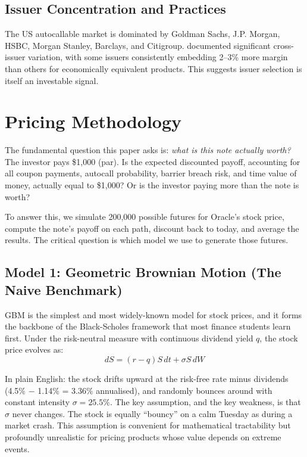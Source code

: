 \documentclass[12pt,a4paper]{article}
\begin{document}
\subsection{Issuer Concentration and Practices}

The US autocallable market is dominated by Goldman Sachs, J.P. Morgan, HSBC, Morgan Stanley, Barclays, and Citigroup. \citet{vokata2021} documented significant cross-issuer variation, with some issuers consistently embedding 2--3\% more margin than others for economically equivalent products. This suggests issuer selection is itself an investable signal.

\newpage
\section{Pricing Methodology}
\label{sec:methodology}

The fundamental question this paper asks is: \textit{what is this note actually worth?} The investor pays \$1,000 (par). Is the expected discounted payoff, accounting for all coupon payments, autocall probability, barrier breach risk, and time value of money, actually equal to \$1,000? Or is the investor paying more than the note is worth?

To answer this, we simulate 200,000 possible futures for Oracle's stock price, compute the note's payoff on each path, discount back to today, and average the results. The critical question is which model we use to generate those futures.

\subsection{Model 1: Geometric Brownian Motion (The Naive Benchmark)}

GBM is the simplest and most widely-known model for stock prices, and it forms the backbone of the Black-Scholes framework that most finance students learn first. Under the risk-neutral measure with continuous dividend yield $q$, the stock price evolves as:
\begin{equation}
    dS = (r-q)S\,dt + \sigma S\,dW
\end{equation}

In plain English: the stock drifts upward at the risk-free rate minus dividends (4.5\% $-$ 1.14\% = 3.36\% annualised), and randomly bounces around with constant intensity $\sigma = 25.5\%$. The key assumption, and the key weakness, is that $\sigma$ never changes. The stock is equally ``bouncy'' on a calm Tuesday as during a market crash. This assumption is convenient for mathematical tractability but profoundly unrealistic for pricing products whose value depends on extreme events.
\end{document}
